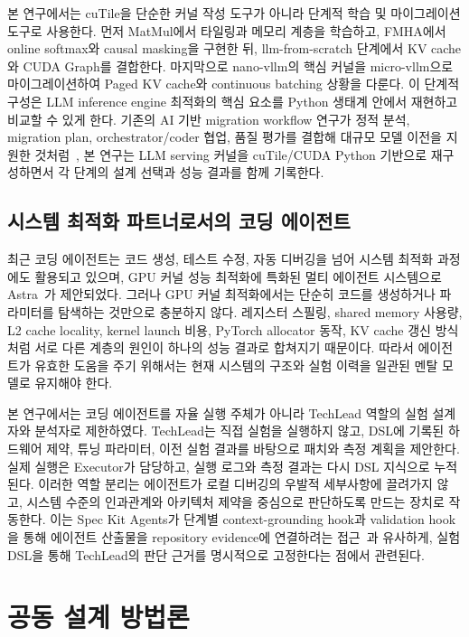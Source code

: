 \documentclass{kcc}            %
\begin{document}
본 연구에서는 cuTile을 단순한 커널 작성 도구가 아니라 단계적 학습 및
마이그레이션 도구로 사용한다. 먼저 MatMul에서 타일링과 메모리 계층을
학습하고, FMHA에서 online softmax와 causal masking을 구현한 뒤,
llm-from-scratch 단계에서 KV cache와 CUDA Graph를 결합한다. 마지막으로
nano-vllm의 핵심 커널을 micro-vllm으로 마이그레이션하여 Paged KV cache와
continuous batching 상황을 다룬다. 이 단계적 구성은 LLM inference engine
최적화의 핵심 요소를 Python 생태계 안에서 재현하고 비교할 수 있게 한다.
기존의 AI 기반 migration workflow 연구가 정적 분석, migration plan,
orchestrator/coder 협업, 품질 평가를 결합해 대규모 모델 이전을 지원한
것처럼~\cite{ai-migration}, 본 연구는 LLM serving 커널을 cuTile/CUDA Python 기반으로
재구성하면서 각 단계의 설계 선택과 성능 결과를 함께 기록한다.

\subsection{시스템 최적화 파트너로서의 코딩 에이전트}
최근 코딩 에이전트는 코드 생성, 테스트 수정, 자동 디버깅을 넘어 시스템
최적화 과정에도 활용되고 있으며, GPU 커널 성능 최적화에 특화된 멀티
에이전트 시스템으로 Astra~\cite{astra}가 제안되었다. 그러나 GPU
커널 최적화에서는 단순히 코드를 생성하거나 파라미터를 탐색하는 것만으로
충분하지 않다. 레지스터 스필링, shared memory 사용량, L2 cache locality,
kernel launch 비용, PyTorch allocator 동작, KV cache 갱신 방식처럼 서로
다른 계층의 원인이 하나의 성능 결과로 합쳐지기 때문이다. 따라서 에이전트가
유효한 도움을 주기 위해서는 현재 시스템의 구조와 실험 이력을 일관된 멘탈
모델로 유지해야 한다.

본 연구에서는 코딩 에이전트를 자율 실행 주체가 아니라 TechLead 역할의 실험
설계자와 분석자로 제한하였다. TechLead는 직접 실험을 실행하지 않고, DSL에
기록된 하드웨어 제약, 튜닝 파라미터, 이전 실험 결과를 바탕으로 패치와
측정 계획을 제안한다. 실제 실행은 Executor가 담당하고, 실행 로그와 측정
결과는 다시 DSL 지식으로 누적된다. 이러한 역할 분리는 에이전트가 로컬
디버깅의 우발적 세부사항에 끌려가지 않고, 시스템 수준의 인과관계와
아키텍처 제약을 중심으로 판단하도록 만드는 장치로 작동한다. 이는 Spec Kit
Agents가 단계별 context-grounding hook과 validation hook을 통해 에이전트
산출물을 repository evidence에 연결하려는 접근~\cite{speckit}과 유사하게, 실험 DSL을
통해 TechLead의 판단 근거를 명시적으로 고정한다는 점에서 관련된다.

\section{공동 설계 방법론}
\end{document}
